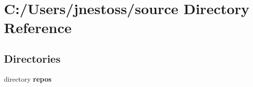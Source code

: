 \section{C\+:/\+Users/jnestoss/source Directory Reference}
\label{dir_b2f33c71d4aa5e7af42a1ca61ff5af1b}
\subsection*{Directories}
\begin{DoxyCompactItemize}
\item 
directory \textbf{ repos}
\end{DoxyCompactItemize}
